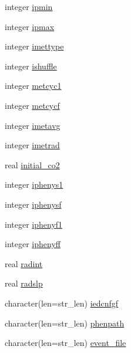 \begin{DoxyCompactItemize}
\item 
integer \hyperlink{structename__coms_1_1ename__vars_addfc503eff7fcf2bc1ef284085010a32}{ipmin}
\item 
integer \hyperlink{structename__coms_1_1ename__vars_a930c2b966704a455b099c6a3fb969827}{ipmax}
\item 
integer \hyperlink{structename__coms_1_1ename__vars_a9bde2e318f0115de72aff2bf59d67621}{imettype}
\item 
integer \hyperlink{structename__coms_1_1ename__vars_a3ec1970fe6cd75be8ad23ae87ca669b7}{ishuffle}
\item 
integer \hyperlink{structename__coms_1_1ename__vars_ac0b6769415708da8c61e4e365b2c8209}{metcyc1}
\item 
integer \hyperlink{structename__coms_1_1ename__vars_a03cab977c22736e0ed58fa340e228844}{metcycf}
\item 
integer \hyperlink{structename__coms_1_1ename__vars_a91b36cf7375007bf0351e2301c23756d}{imetavg}
\item 
integer \hyperlink{structename__coms_1_1ename__vars_a0117297a1b806712a2f0e0ac4e3e1c6a}{imetrad}
\item 
real \hyperlink{structename__coms_1_1ename__vars_a70321cc1ab2d45a54a13c563bb690bd1}{initial\+\_\+co2}
\item 
integer \hyperlink{structename__coms_1_1ename__vars_a342e09da2bf680ce75590217da9816b6}{iphenys1}
\item 
integer \hyperlink{structename__coms_1_1ename__vars_a7620b597e7a8a5960bdcfefdda5af4b1}{iphenysf}
\item 
integer \hyperlink{structename__coms_1_1ename__vars_a644ecb44951fd4ea5202e801dfa44a62}{iphenyf1}
\item 
integer \hyperlink{structename__coms_1_1ename__vars_a03ffbf246f44edc90811379dd343f629}{iphenyff}
\item 
real \hyperlink{structename__coms_1_1ename__vars_a6c492cf91d3ce8206919a372da7409ef}{radint}
\item 
real \hyperlink{structename__coms_1_1ename__vars_a6533bf9c921fa9e850d914e6d75439f3}{radslp}
\item 
character(len=str\+\_\+len) \hyperlink{structename__coms_1_1ename__vars_a68990b5aabd2cfb67e6d9c479f9d9212}{iedcnfgf}
\item 
character(len=str\+\_\+len) \hyperlink{structename__coms_1_1ename__vars_a3cd7a9b820dac3238181ea9791a817c7}{phenpath}
\item 
character(len=str\+\_\+len) \hyperlink{structename__coms_1_1ename__vars_a02891d892272c9dee04feae31b7858aa}{event\+\_\+file}

\end{DoxyCompactItemize}
